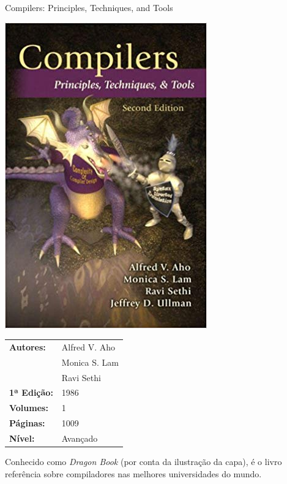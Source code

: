 \begin{frame}[fragile]{Compilers: Principles, Techniques, and Tools}

    \begin{minipage}{0.4\textwidth}
        \includegraphics[scale=0.25]{aho.jpg}
    \end{minipage}
    \begin{minipage}{0.5\textwidth}
        \begin{small}
            \begin{tabularx}{0.95\textwidth}{lX}
                \textbf{Autores:} & Alfred V. Aho \\
                & Monica S. Lam \\
                & Ravi Sethi \\
                \textbf{1ª Edição:} & 1986 \\
                \textbf{Volumes:} & 1 \\
                \textbf{Páginas:} & 1009 \\
                \textbf{Nível:} & Avançado \\
            \end{tabularx}
        \end{small}
    \end{minipage}

    \vspace{0.2in} 

    Conhecido como \textit{Dragon Book} (por conta da ilustração da capa), é o livro referência
    sobre compiladores nas melhores universidades do mundo.

\end{frame}


